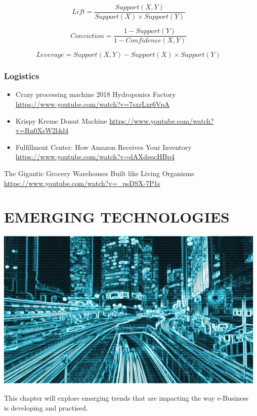 \documentclass[]{book}
\begin{document}
\[Lift = \frac{Support(X,Y)}{Support(X) \times Support(Y)}\]

\[Conviction = \frac{1 - Support(Y)}{1 - Confidence(X,Y)}\]

\[Leverage = Support(X,Y) - Support(X)\times Support(Y)\]

\hypertarget{logistics}{%
\subsection{Logistics}\label{logistics}}

\begin{itemize}
\item
  Crazy processing machine 2018 \textbar{} Hydroponics Factory
  \url{https://www.youtube.com/watch?v=7sxrLxr6VpA}
\item
  Krispy Kreme Donut Machine
  \url{https://www.youtube.com/watch?v=Rn0XsW2l4d4}
\item
  Fulfillment Center:
  How Amazon Receives Your Inventory \url{https://www.youtube.com/watch?v=dAXdeqcHBp4}
\end{itemize}

The Gigantic Grocery Warehouses Built like Living Organisms \url{https://www.youtube.com/watch?v=_psDSX-7P1s}

\hypertarget{emerging-technologies}{%
\chapter{EMERGING TECHNOLOGIES}\label{emerging-technologies}}

\begin{center}\includegraphics[width=0.9\linewidth]{images/computer1280} \end{center}

This chapter will explore emerging trends that are impacting the way e-Business is developing and practised.
\end{document}
